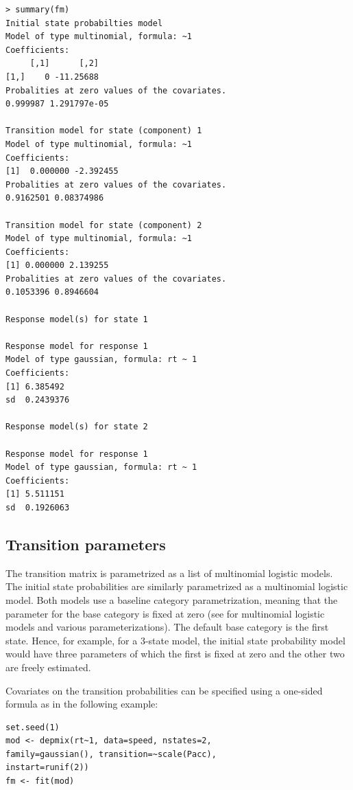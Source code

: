 \documentclass[article]{jss}
\begin{document}
\begin{verbatim}
> summary(fm)
Initial state probabilties model 
Model of type multinomial, formula: ~1
Coefficients: 
     [,1]      [,2]
[1,]    0 -11.25688
Probalities at zero values of the covariates.
0.999987 1.291797e-05 

Transition model for state (component) 1 
Model of type multinomial, formula: ~1
Coefficients: 
[1]  0.000000 -2.392455
Probalities at zero values of the covariates.
0.9162501 0.08374986 

Transition model for state (component) 2 
Model of type multinomial, formula: ~1
Coefficients: 
[1] 0.000000 2.139255
Probalities at zero values of the covariates.
0.1053396 0.8946604 

Response model(s) for state 1 

Response model for response 1 
Model of type gaussian, formula: rt ~ 1
Coefficients: 
[1] 6.385492
sd  0.2439376 

Response model(s) for state 2 

Response model for response 1 
Model of type gaussian, formula: rt ~ 1
Coefficients: 
[1] 5.511151
sd  0.1926063 
\end{verbatim}


\subsection{Transition parameters}

The transition matrix is parametrized as a list of multinomial
logistic models.  The initial state probabilities are similarly
parametrized as a multinomial logistic model.  Both models use a
baseline category parametrization, meaning that the parameter for the
base category is fixed at zero (see \citet[see][p.\ 267
ff.]{Agresti2002} for multinomial logistic models and various
parameterizations).  The default base category is the first state.
Hence, for example, for a 3-state model, the initial state probability
model would have three parameters of which the first is fixed at zero
and the other two are freely estimated.

Covariates on the transition probabilities can be specified using a
one-sided formula as in the following example:
\begin{verbatim}
set.seed(1)
mod <- depmix(rt~1, data=speed, nstates=2, 
family=gaussian(), transition=~scale(Pacc), 
instart=runif(2))
fm <- fit(mod)
\end{verbatim}
\end{document}
